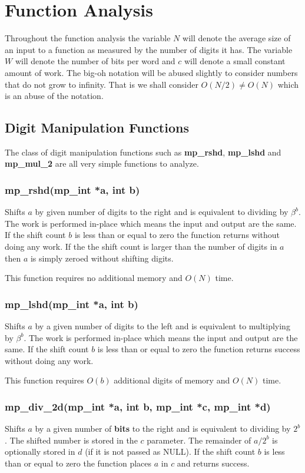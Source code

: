 \documentclass{article}
\begin{document}
\section{Function Analysis}

Throughout the function analysis the variable $N$ will denote the average size of an input to a function as measured 
by the number of digits it has.  The variable $W$ will denote the number of bits per word and $c$ will denote a small
constant amount of work.  The big-oh notation will be abused slightly to consider numbers that do not grow to infinity.
That is we shall consider $O(N/2) \ne O(N)$ which is an abuse of the notation.

\subsection{Digit Manipulation Functions}
The class of digit manipulation functions such as \textbf{mp\_rshd}, \textbf{mp\_lshd} and \textbf{mp\_mul\_2} are all
very simple functions to analyze.  

\subsubsection{mp\_rshd(mp\_int *a, int b)}
Shifts $a$ by given number of digits to the right and is equivalent to dividing by $\beta^b$.  The work is performed
in-place which means the input and output are the same.  If the shift count $b$ is less than or equal to zero 
the function returns without doing any work.  If the the shift count is larger than the number of digits in $a$ 
then $a$ is simply zeroed without shifting digits.

This function requires no additional memory and $O(N)$ time.

\subsubsection{mp\_lshd(mp\_int *a, int b)}
Shifts $a$ by a given number of digits to the left and is equivalent to multiplying by $\beta^b$.  The work
is performed in-place which means the input and output are the same.  If the shift count $b$ is less than or equal 
to zero the function returns success without doing any work.

This function requires $O(b)$ additional digits of memory and $O(N)$ time.

\subsubsection{mp\_div\_2d(mp\_int *a, int b, mp\_int *c, mp\_int *d)}
Shifts $a$ by a given number of \textbf{bits} to the right and is equivalent to dividing by $2^b$.  The shifted number is stored
in the $c$ parameter.  The remainder of $a/2^b$ is optionally stored in $d$ (if it is not passed as NULL).  
If the shift count $b$ is less than or equal to zero the function places $a$ in $c$ and returns success.  
\end{document}
